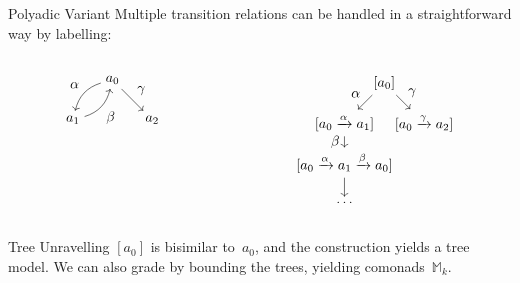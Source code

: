 \documentclass{beamer}
\newcommand{\M}{\mathbb{M}}
\newcommand{\Mk}{\M_{k}}
\begin{document}
\begin{frame}{Polyadic Variant}
Multiple transition relations can be handled in a straightforward way by labelling:
\begin{columns}
\begin{column}{0.5\textwidth}
\begin{equation*}
    \begin{tikzpicture}
        \path node(a0) {$a_0$} +(-1,-1) node (a1) {$a_1$} +(1,-1) node(a2) {$a_2$};
        \path[->] 
        (a0) edge[bend right] node[midway, above left]{$\alpha$} (a1)
        (a1) edge[bend right] node[midway, below right]{$\beta$} (a0)
        (a0) edge node[midway, above right]{$\gamma$} (a2);
        \end{tikzpicture}
    \end{equation*}
\end{column}
\begin{column}{0.5\textwidth}
\begin{equation*}
    \begin{tikzpicture}
    \path 
    node (a) {$[a_0]$} +(-1,-1) 
    node (b) {$[a_0 \xrightarrow{\alpha} a_1]$} ++(1,-1)
    node (c) {$[a_0 \xrightarrow{\gamma} a_2]$} (b) ++(0,-1)
    node (a') {$[a_0 \xrightarrow{\alpha} a_1 \xrightarrow{\beta} a_0]$} ++(0,-1)
    node (dots) {$\ldots$};
    \path[->]
    (a) edge node[midway, above left]{$\alpha$} (b)
    (a) edge node[midway, above right]{$\gamma$} (c)
    (b) edge node[midway, left]{$\beta$} (a')
    (a') edge (dots);
    \end{tikzpicture}
\end{equation*}
\end{column}
\end{columns}
\pause
\begin{block}{Tree Unravelling}
$[a_0]$ is bisimilar to~$a_0$, and the construction yields a tree model. We can also grade by bounding the trees, yielding comonads~$\Mk$.
\end{block}
\end{frame}
\end{document}
